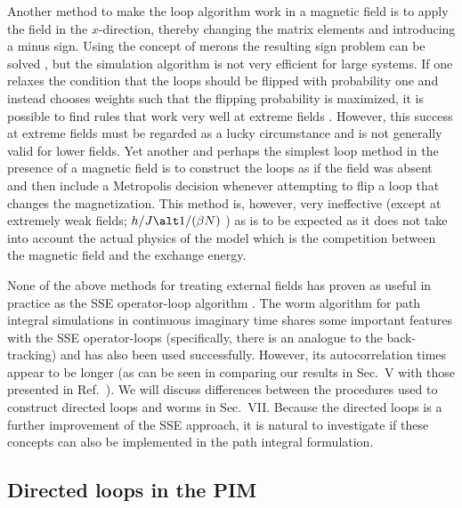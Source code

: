 \documentclass[10pt,pre,aps,twocolumn,showpacs,superscriptaddress,
floatfix]{revtex4}
\begin{document}
Another method to make the loop algorithm work in a magnetic field is to 
apply the field in the $x$-direction, thereby changing the matrix 
elements and introducing a minus sign. Using the concept of merons the
resulting sign problem can be solved \cite{chandrasekharan,cox}, but the
simulation algorithm is not very efficient for large systems. If one relaxes 
the condition that the loops should be flipped with probability one and 
instead chooses weights such that the flipping probability is maximized, it 
is possible to find rules that work very well at extreme fields 
\cite{syljuasen}. However, this success at extreme fields must be regarded 
as a lucky circumstance and is not generally valid for lower fields. Yet 
another and perhaps the simplest loop method in the presence of a magnetic 
field is to construct the loops as if the field was absent and then include 
a Metropolis decision whenever attempting to flip a loop that changes the 
magnetization. This method is, however, very ineffective \cite{dorneich2} 
(except at extremely weak fields; $h/J \alt 1/(\beta N)$ \cite{troyer}) as 
is to be expected as it does not take into account the actual physics of 
the model which is the competition between the magnetic field and the 
exchange energy. 

None of the above methods for treating external fields has proven as useful 
in practice as the SSE operator-loop algorithm \cite{sse3}. The worm algorithm
for path integral simulations in continuous imaginary time \cite{prokofev}
shares some important features with the SSE operator-loops (specifically, 
there is an analogue to the back-tracking) and has also been used successfully.
However, its autocorrelation times appear to be longer (as can be seen in 
comparing our results in Sec.~V with those presented in 
Ref.~). We will discuss differences between the 
procedures used to construct directed loops and worms in Sec.~VII. Because 
the directed loops is a further improvement of the SSE approach, it is natural
to investigate if these concepts can also be implemented in the path 
integral formulation. 

\subsection{Directed loops in the PIM}
\end{document}
